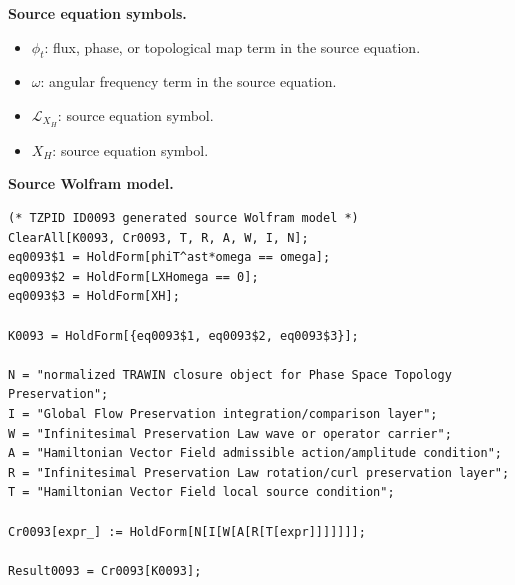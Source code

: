\begin{minipage}[t]{0.49\linewidth}
\begingroup
\small
\raggedright
\textbf{Source equation symbols.}\par
\begin{itemize}[leftmargin=1.35em,itemsep=1pt,topsep=1pt,parsep=0pt]
    \item $\phi_t$: flux, phase, or topological map term in the source equation.
    \item $\omega$: angular frequency term in the source equation.
    \item $\mathcal{L}_{X_H}$: source equation symbol.
    \item $X_H$: source equation symbol.
\end{itemize}
\endgroup
\end{minipage}\hfill
\begin{minipage}[t]{0.47\linewidth}
\begingroup
\scriptsize
\raggedright
\textbf{Source Wolfram model.}\par
\begin{Verbatim}[fontsize=\tiny,breaklines=true,breakanywhere=true]
(* TZPID ID0093 generated source Wolfram model *)
ClearAll[K0093, Cr0093, T, R, A, W, I, N];
eq0093$1 = HoldForm[phiT^ast*omega == omega];
eq0093$2 = HoldForm[LXHomega == 0];
eq0093$3 = HoldForm[XH];

K0093 = HoldForm[{eq0093$1, eq0093$2, eq0093$3}];

N = "normalized TRAWIN closure object for Phase Space Topology Preservation";
I = "Global Flow Preservation integration/comparison layer";
W = "Infinitesimal Preservation Law wave or operator carrier";
A = "Hamiltonian Vector Field admissible action/amplitude condition";
R = "Infinitesimal Preservation Law rotation/curl preservation layer";
T = "Hamiltonian Vector Field local source condition";

Cr0093[expr_] := HoldForm[N[I[W[A[R[T[expr]]]]]]];

Result0093 = Cr0093[K0093];
\end{Verbatim}
\endgroup
\end{minipage}

